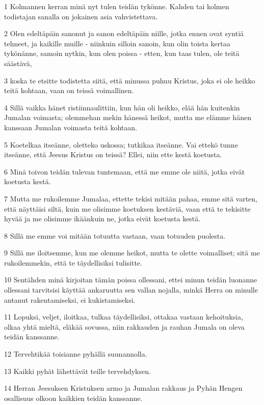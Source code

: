 \par 1 Kolmannen kerran minä nyt tulen teidän tykönne. Kahden tai kolmen todistajan sanalla on jokainen asia vahvistettava.
\par 2 Olen edeltäpäin sanonut ja sanon edeltäpäin niille, jotka ennen ovat syntiä tehneet, ja kaikille muille - niinkuin silloin sanoin, kun olin toista kertaa tykönänne, samoin nytkin, kun olen poissa - etten, kun taas tulen, ole teitä säästävä,
\par 3 koska te etsitte todistetta siitä, että minussa puhuu Kristus, joka ei ole heikko teitä kohtaan, vaan on teissä voimallinen.
\par 4 Sillä vaikka hänet ristiinnaulittiin, kun hän oli heikko, elää hän kuitenkin Jumalan voimasta; olemmehan mekin hänessä heikot, mutta me elämme hänen kanssaan Jumalan voimasta teitä kohtaan.
\par 5 Koetelkaa itseänne, oletteko uskossa; tutkikaa itseänne. Vai ettekö tunne itseänne, että Jeesus Kristus on teissä? Ellei, niin ette kestä koetusta.
\par 6 Minä toivon teidän tulevan tuntemaan, että me emme ole niitä, jotka eivät koetusta kestä.
\par 7 Mutta me rukoilemme Jumalaa, ettette tekisi mitään pahaa, emme sitä varten, että näyttäisi siltä, kuin me olisimme koetuksen kestäviä, vaan että te tekisitte hyvää ja me olisimme ikäänkuin ne, jotka eivät koetusta kestä.
\par 8 Sillä me emme voi mitään totuutta vastaan, vaan totuuden puolesta.
\par 9 Sillä me iloitsemme, kun me olemme heikot, mutta te olette voimalliset; sitä me rukoilemmekin, että te täydellisiksi tulisitte.
\par 10 Sentähden minä kirjoitan tämän poissa ollessani, ettei minun teidän luonanne ollessani tarvitsisi käyttää ankaruutta sen vallan nojalla, minkä Herra on minulle antanut rakentamiseksi, ei kukistamiseksi.
\par 11 Lopuksi, veljet, iloitkaa, tulkaa täydellisiksi, ottakaa vastaan kehoituksia, olkaa yhtä mieltä, eläkää sovussa, niin rakkauden ja rauhan Jumala on oleva teidän kanssanne.
\par 12 Tervehtikää toisianne pyhällä suunannolla.
\par 13 Kaikki pyhät lähettävät teille tervehdyksen.
\par 14 Herran Jeesuksen Kristuksen armo ja Jumalan rakkaus ja Pyhän Hengen osallisuus olkoon kaikkien teidän kanssanne.


